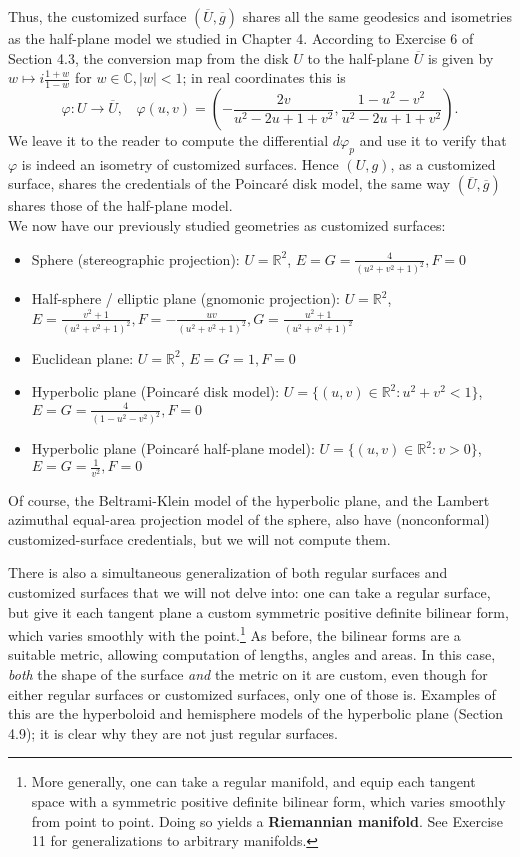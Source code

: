 \documentclass[leqno]{book}
\begin{document}
Thus, the customized surface $(\overline U,\overline g)$ shares all the same geodesics and isometries as the half-plane model we studied in Chapter 4.  According to Exercise 6 of Section 4.3, the conversion map from the disk $U$ to the half-plane $\overline U$ is given by $w\mapsto i\frac{1+w}{1-w}$ for $w\in\mathbb C,|w|<1$; in real coordinates this is
$$\varphi:U\to\overline U,~~~~\varphi(u,v)=\left(-\frac{2v}{u^2-2u+1+v^2},\frac{1-u^2-v^2}{u^2-2u+1+v^2}\right).$$
We leave it to the reader to compute the differential $d\varphi_p$ and use it to verify that $\varphi$ is indeed an isometry of customized surfaces.  Hence $(U,g)$, as a customized surface, shares the credentials of the Poincar\'e disk model, the same way $(\overline U,\overline g)$ shares those of the half-plane model.\\

\noindent We now have our previously studied geometries as customized surfaces:
\begin{itemize}
\item Sphere (stereographic projection): $U=\mathbb R^2$, $E=G=\frac 4{(u^2+v^2+1)^2},F=0$

\item Half-sphere / elliptic plane (gnomonic projection): $U=\mathbb R^2$, $E=\frac{v^2+1}{(u^2+v^2+1)^2},F=-\frac{uv}{(u^2+v^2+1)^2},G=\frac{u^2+1}{(u^2+v^2+1)^2}$

\item Euclidean plane: $U=\mathbb R^2$, $E=G=1,F=0$

\item Hyperbolic plane (Poincar\'e disk model): $U=\{(u,v)\in\mathbb R^2:u^2+v^2<1\}$, $E=G=\frac 4{(1-u^2-v^2)^2},F=0$

\item Hyperbolic plane (Poincar\'e half-plane model): $U=\{(u,v)\in\mathbb R^2:v>0\}$, $E=G=\frac 1{v^2},F=0$
\end{itemize}
Of course, the Beltrami-Klein model of the hyperbolic plane, and the Lambert azimuthal equal-area projection model of the sphere, also have (nonconformal) customized-surface credentials, but we will not compute them. %

There is also a simultaneous generalization of both regular surfaces and customized surfaces that we will not delve into: one can take a regular surface, but give it each tangent plane a custom symmetric positive definite bilinear form, which varies smoothly with the point.\footnote{More generally, one can take a regular manifold, and equip each tangent space with a symmetric positive definite bilinear form, which varies smoothly from point to point.  Doing so yields a \textbf{Riemannian manifold}.  See Exercise 11 for generalizations to arbitrary manifolds.}  As before, the bilinear forms are a suitable metric, allowing computation of lengths, angles and areas.  In this case, \emph{both} the shape of the surface \emph{and} the metric on it are custom, even though for either regular surfaces or customized surfaces, only one of those is.  Examples of this are the hyperboloid and hemisphere models of the hyperbolic plane (Section 4.9); it is clear why they are not just regular surfaces.
\end{document}
